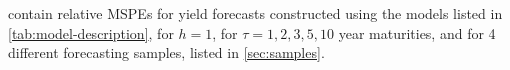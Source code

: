  contain relative MSPEs for yield forecasts constructed using the models listed in \cref{tab:model-description}, for $h = 1$, for $\tau = 1, 2, 3, 5, 10$ year maturities, and for 4 different forecasting samples, listed in \cref{sec:samples}. 